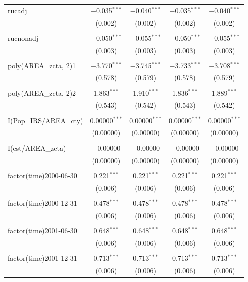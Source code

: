 \begin{table}[!htbp]
\begin{tabular}{@{\extracolsep{5pt}}lcccc}
 rucadj & $-$0.035$^{***}$ & $-$0.040$^{***}$ & $-$0.035$^{***}$ & $-$0.040$^{***}$ \\ 
  & (0.002) & (0.002) & (0.002) & (0.002) \\ 
  & & & & \\ 
 rucnonadj & $-$0.050$^{***}$ & $-$0.055$^{***}$ & $-$0.050$^{***}$ & $-$0.055$^{***}$ \\ 
  & (0.003) & (0.003) & (0.003) & (0.003) \\ 
  & & & & \\ 
 poly(AREA\_zcta, 2)1 & $-$3.770$^{***}$ & $-$3.745$^{***}$ & $-$3.733$^{***}$ & $-$3.708$^{***}$ \\ 
  & (0.578) & (0.579) & (0.578) & (0.579) \\ 
  & & & & \\ 
 poly(AREA\_zcta, 2)2 & 1.863$^{***}$ & 1.910$^{***}$ & 1.836$^{***}$ & 1.889$^{***}$ \\ 
  & (0.543) & (0.542) & (0.543) & (0.542) \\ 
  & & & & \\ 
 I(Pop\_IRS/AREA\_cty) & 0.00000$^{***}$ & 0.00000$^{***}$ & 0.00000$^{***}$ & 0.00000$^{***}$ \\ 
  & (0.00000) & (0.00000) & (0.00000) & (0.00000) \\ 
  & & & & \\ 
 I(est/AREA\_zcta) & $-$0.00000 & $-$0.00000 & $-$0.00000 & $-$0.00000 \\ 
  & (0.00000) & (0.00000) & (0.00000) & (0.00000) \\ 
  & & & & \\ 
 factor(time)2000-06-30 & 0.221$^{***}$ & 0.221$^{***}$ & 0.221$^{***}$ & 0.221$^{***}$ \\ 
  & (0.006) & (0.006) & (0.006) & (0.006) \\ 
  & & & & \\ 
 factor(time)2000-12-31 & 0.478$^{***}$ & 0.478$^{***}$ & 0.478$^{***}$ & 0.478$^{***}$ \\ 
  & (0.006) & (0.006) & (0.006) & (0.006) \\ 
  & & & & \\ 
 factor(time)2001-06-30 & 0.648$^{***}$ & 0.648$^{***}$ & 0.648$^{***}$ & 0.648$^{***}$ \\ 
  & (0.006) & (0.006) & (0.006) & (0.006) \\ 
  & & & & \\ 
 factor(time)2001-12-31 & 0.713$^{***}$ & 0.713$^{***}$ & 0.713$^{***}$ & 0.713$^{***}$ \\ 
  & (0.006) & (0.006) & (0.006) & (0.006) \\ 

\end{tabular}
\end{table}
